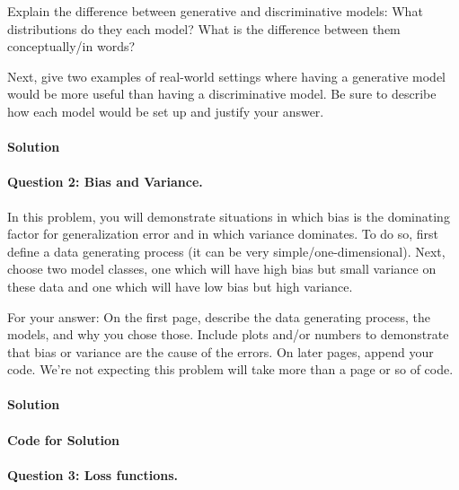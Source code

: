 \documentclass[12pt,letterpaper]{article}
\begin{document}
Explain the difference between generative and discriminative models: What distributions do they each model?  What is the difference between them conceptually/in words?  

Next, give two examples of real-world settings where having a generative model would be more useful than having a discriminative model.  Be sure to describe how each model would be set up and justify your answer.

\newpage

\paragraph{Solution}

\newpage 

\paragraph{Question 2: Bias and Variance.}  

In this problem, you will demonstrate situations in which bias is the dominating factor for generalization error and in which variance dominates.  To do so, first define a data generating process (it can be very simple/one-dimensional).  Next, choose two model classes, one which will have high bias but small variance on these data and one which will have low bias but high variance.

For your answer: On the first page, describe the data generating process, the models, and why you chose those.  Include plots and/or numbers to demonstrate that bias or variance are the cause of the errors.  On later pages, append your code.  We're not expecting this problem will take more than a page or so of code.

\newpage

\paragraph{Solution}

\newpage

\paragraph{Code for Solution}

\newpage 

\paragraph{Question 3: Loss functions.}
  
\end{document}
